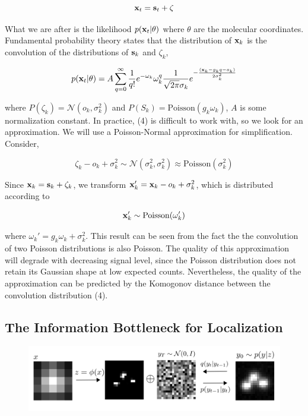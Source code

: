 \documentclass{article}
\begin{document}
\begin{equation}
\bold{x}_t = \bold{s}_t + \bold{\zeta}
\end{equation}

What we are after is the likelihood $p(\bold{x}_{t}|\theta)$ where $\theta$ are the molecular coordinates. Fundamental probability theory states that the distribution of $\bold{x}_{k}$ is the convolution of the distributions of $\bold{s}_{k}$ and $\zeta_{k}$,

\begin{equation}
p(\bold{x}_{t}|\theta) = A\sum_{q=0}^{\infty} \frac{1}{q!}e^{-\omega_{k}}\omega_{k}^{q}\frac{1}{\sqrt{2\pi}\sigma_{k}}e^{-\frac{(\bold{x}_{k}-g_{k}q-o_{k})}{2\sigma_{k}^{2}}}
\end{equation}

where $P(\zeta_{k}) = \mathcal{N}(o_{k},\sigma_{k}^{2})$ and $P(S_{k}) = \mathrm{Poisson}(g_{k}\omega_{k})$,  $A$ is some normalization constant. In practice, (4) is difficult to work with, so we look for an approximation. We will use a Poisson-Normal approximation for simplification. Consider,

\begin{equation}
\zeta_{k} - o_{k} + \sigma_{k}^{2} \sim \mathcal{N}(\sigma_{k}^{2},\sigma_{k}^{2}) \approx \mathrm{Poisson}(\sigma_{k}^{2})
\end{equation}

Since $\bold{x}_{k} = \bold{s}_{k} + \zeta_{k}$, we transform $\bold{x}_{k}' = \bold{x}_{k} - o_{k} + \sigma_{k}^{2}$, which is distributed according to 

\begin{equation}
\bold{x}_{k}' \sim \mathrm{Poisson}(\omega_{k}')
\end{equation}

where $\omega_{k}' = g_{k}\omega_{k} + \sigma_{k}^{2}$. This result can be seen from the fact the the convolution of two Poisson distributions is also Poisson. The quality of this approximation will degrade with decreasing signal level, since the Poisson distribution does not retain its Gaussian shape at low expected counts. Nevertheless, the quality of the approximation can be predicted by the Komogonov distance between the convolution distribution (4).

\subsection{The Information Bottleneck for Localization}

\begin{figure}
\includegraphics[scale=4.0]{Denoise.png}
\end{figure}
\end{document}
